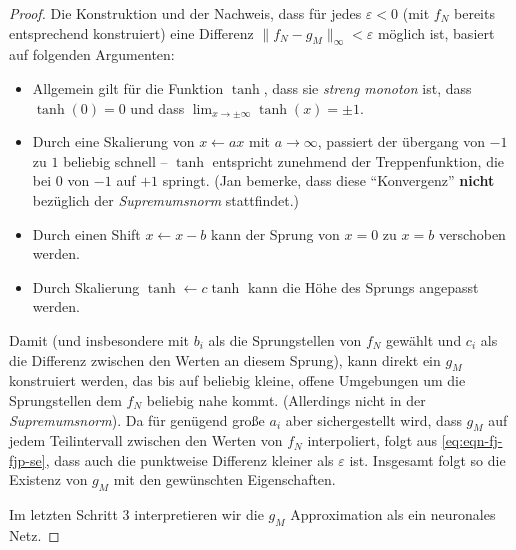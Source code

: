 \documentclass[
]{book}
\theoremstyle{definition}
\theoremstyle{definition}
\theoremstyle{definition}
\theoremstyle{definition}
\theoremstyle{remark}
\begin{document}
\begin{proof}
Die Konstruktion und der Nachweis, dass für jedes \(\varepsilon<0\) (mit \(f_N\) bereits entsprechend konstruiert) eine Differenz \(\|f_N - g_M\|_\infty < \varepsilon\) möglich ist, basiert auf folgenden Argumenten:

\begin{itemize}
\item
  Allgemein gilt für die Funktion \(\tanh\), dass sie \emph{streng monoton} ist,
  dass \(\tanh(0)=0\) und dass \(\lim_{x\to \pm \infty} \tanh(x) = \pm 1\).
\item
  Durch eine Skalierung von \(x\leftarrow ax\) mit \(a\to \infty\), passiert der übergang von \(-1\) zu \(1\)
  beliebig schnell -- \(\tanh\) entspricht zunehmend der Treppenfunktion, die
  bei \(0\) von \(-1\) auf \(+1\) springt. (Jan bemerke, dass diese ``Konvergenz''
  \textbf{nicht} bezüglich der \emph{Supremumsnorm} stattfindet.)
\item
  Durch einen Shift \(x \leftarrow x-b\) kann der Sprung von \(x=0\) zu \(x=b\)
  verschoben werden.
\item
  Durch Skalierung \(\tanh \leftarrow c\tanh\) kann die Höhe des Sprungs
  angepasst werden.
\end{itemize}

Damit (und insbesondere mit \(b_i\) als die Sprungstellen von \(f_N\) gewählt
und \(c_i\) als die Differenz zwischen den Werten an diesem Sprung), kann direkt
ein \(g_M\) konstruiert werden, das bis auf beliebig kleine, offene Umgebungen um die
Sprungstellen dem \(f_N\) beliebig nahe kommt. (Allerdings nicht in der
\emph{Supremumsnorm}).
Da für genügend große \(a_i\) aber sichergestellt wird, dass \(g_M\)
auf jedem Teilintervall zwischen den Werten von \(f_N\) interpoliert, folgt aus
\eqref{eq:eqn-fj-fjp-se},
dass auch die punktweise Differenz kleiner als \(\varepsilon\)
ist.
Insgesamt folgt so die Existenz von \(g_M\) mit den gewünschten
Eigenschaften.

Im letzten Schritt 3 interpretieren wir die \(g_M\) Approximation als ein neuronales
Netz.


\end{proof}
\end{document}
